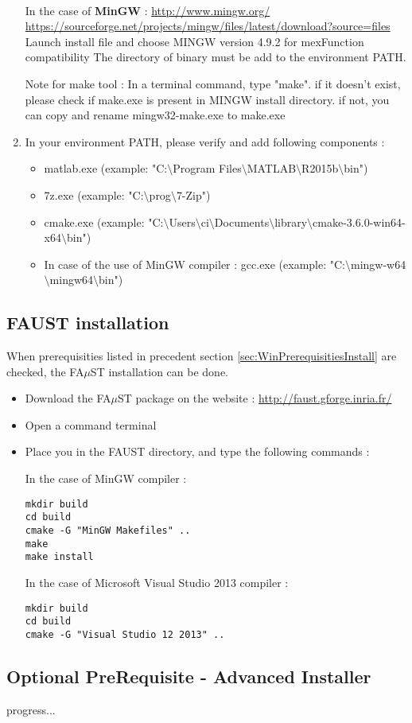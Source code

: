 \begin{enumerate}
\paragraph{}In the case of \textbf{MinGW} :
\url{http://www.mingw.org/}
\url{https://sourceforge.net/projects/mingw/files/latest/download?source=files}
Launch install file and choose MINGW version 4.9.2 for mexFunction compatibility 
The directory of binary must be add to the environment PATH. 

Note for make tool : In a terminal command, type "make". if it doesn't exist, please check if make.exe is present in MINGW install directory.
if not, you can copy and rename mingw32-make.exe to make.exe


\item In your environment PATH, please verify and add following components :

\begin{itemize}
\item matlab.exe (example: "C:$\setminus$Program Files$\setminus$MATLAB$\setminus$R2015b$\setminus$bin")
\item 7z.exe (example: "C:$\setminus$prog$\setminus$7-Zip")
\item cmake.exe (example: "C:$\setminus$Users$\setminus$ci$\setminus$Documents$\setminus$library$\setminus$cmake-3.6.0-win64-x64$\setminus$bin")
\item In case of the use of MinGW compiler : gcc.exe (example: "C:$\setminus$mingw-w64$\setminus$mingw64$\setminus$bin")
\end{itemize}
\end{enumerate}


\subsection{FAUST installation}\label{sec:WinFaustInstall}
When prerequisities listed in precedent section \ref{sec:WinPrerequisitiesInstall} are checked, the FA$\mu$ST installation can be done. 
\begin{itemize}
\item Download the FA$\mu$ST package on the website :  \url{http://faust.gforge.inria.fr/}
\item Open a command terminal
\item Place you in the FAUST directory, and type the following commands : 

In the case of MinGW compiler :
\begin{lstlisting}
mkdir build
cd build
cmake -G "MinGW Makefiles" .. 
make
make install
\end{lstlisting}

In the case of Microsoft Visual Studio 2013 compiler :
\begin{lstlisting}
mkdir build
cd build
cmake -G "Visual Studio 12 2013" .. 
\end{lstlisting}

\end{itemize}


\subsection{Optional PreRequisite - Advanced Installer}\label{sec:WinOptionalInstall}

progress... 




